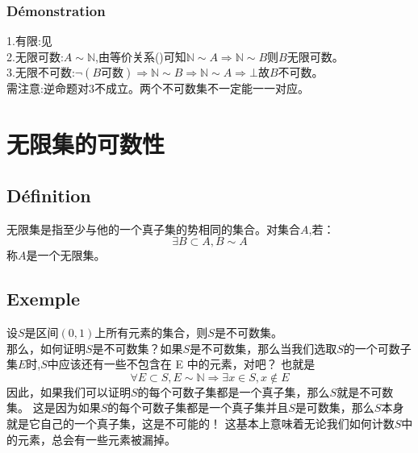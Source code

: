 \documentclass[12pt, a4paper, oneside]{ctexbook}
\begin{document}
  \subsubsection{Démonstration}
  \noindent
  1.有限:见 \\
  2.无限可数:$A\sim \mathbb{N}$,由等价关系()可知$\mathbb{N}\sim A\Rightarrow\mathbb{N}\sim B$则$B$无限可数。\\
  3.无限不可数:$\lnot(B\text{可数})\Rightarrow\mathbb{N}\sim B\Rightarrow\mathbb{N}\sim A\Rightarrow\bot$故$B$不可数。\\
  需注意:逆命题对3不成立。两个不可数集不一定能一一对应。

\section{无限集的可数性}
  \subsection{Définition}
  无限集是指至少与他的一个真子集的势相同的集合。对集合$A$,若：
  $$
    \exists B\subset A, B\sim A
  $$
  称$A$是一个无限集。
  \subsection{Exemple}
  设$S$是区间$(0,1)$上所有元素的集合，则$S$是不可数集。\\

  那么，如何证明$S$是不可数集？如果$S$是不可数集，那么当我们选取$S$的一个可数子集$E$时,$S$中应该还有一些不包含在 E 中的元素，对吧？
  也就是
  $$
    \forall E\subset S,E\sim \mathbb{N}\Rightarrow \exists x\in S,x\notin E 
  $$
  因此，如果我们可以证明$S$的每个可数子集都是一个真子集，那么$S$就是不可数集。
  这是因为如果$S$的每个可数子集都是一个真子集并且$S$是可数集，那么$S$本身就是它自己的一个真子集，这是不可能的！
  这基本上意味着无论我们如何计数$S$中的元素，总会有一些元素被漏掉。
\end{document}
